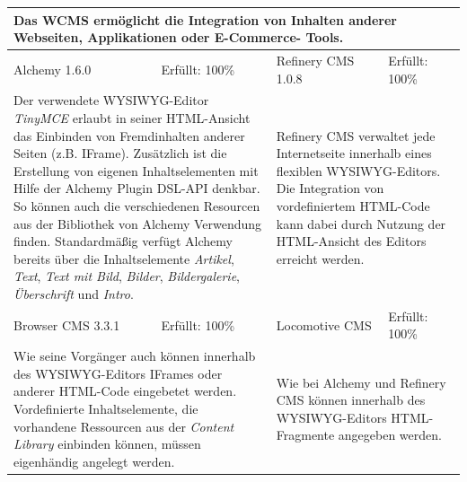 \begin{tabular}[!ht]{|l|l|l|l|}
\hline
\multicolumn{4}{|p{15cm}|}{\textbf{Das WCMS ermöglicht die Integration von Inhalten anderer Webseiten, Applikationen oder E-Commerce- Tools.}} \\
\hline
  Alchemy 1.6.0 & \cellcolor{green}Erfüllt: 100\% & Refinery CMS 1.0.8 & \cellcolor{green}Erfüllt: 100\% \\
  \hline
  \multicolumn{2}{|p{7.5cm}|}{Der verwendete WYSIWYG-Editor \emph{TinyMCE} erlaubt in seiner HTML-Ansicht das Einbinden von Fremdinhalten anderer Seiten (z.B. IFrame). Zusätzlich ist die Erstellung von eigenen Inhaltselementen mit Hilfe der Alchemy Plugin DSL-API denkbar. So können auch die verschiedenen Resourcen aus der Bibliothek von Alchemy Verwendung finden. Standardmäßig verfügt Alchemy bereits über die Inhaltselemente \emph{Artikel}, \emph{Text}, \emph{Text mit Bild}, \emph{Bilder}, \emph{Bildergalerie}, \emph{Überschrift} und \emph{Intro}.}
   & \multicolumn{2}{p{7.5cm}|}{Refinery CMS verwaltet jede Internetseite innerhalb eines flexiblen WYSIWYG-Editors. Die Integration von vordefiniertem HTML-Code kann dabei durch Nutzung der HTML-Ansicht des Editors erreicht werden.
} \\
  \hline
  Browser CMS 3.3.1 & \cellcolor{green}Erfüllt: 100\% & Locomotive CMS & \cellcolor{green}Erfüllt: 100\% \\
  \hline
  \multicolumn{2}{|p{7.5cm}|}{Wie seine Vorgänger auch können innerhalb des WYSIWYG-Editors IFrames oder anderer HTML-Code eingebetet werden. Vordefinierte Inhaltselemente, die vorhandene Ressourcen aus der \emph{Content Library} einbinden können, müssen eigenhändig angelegt werden.} & \multicolumn{2}{p{7.5cm}|}{Wie bei Alchemy und Refinery CMS können innerhalb des  WYSIWYG-Editors HTML-Fragmente angegeben werden.} \\
\hline
\end{tabular}
